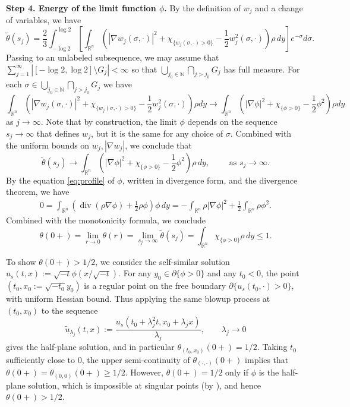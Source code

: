 \documentclass[11pt]{article}
\numberwithin{equation}{section}
\theoremstyle{definition}
\newcommand{\RR}{\mathbb{R}}
\DeclareMathOperator{\divg}{div}
\begin{document}
{\bf Step 4. Energy of the limit function $\phi$.}
By the definition of $w_j$ and a change of variables, we have
\[ \tilde{\theta}(s_j) = \frac23 \int_{-\log 2}^{\log 2} \left[ \int_{\RR^n} \left(|\nabla w_j(\sigma, \cdot)|^2 + \chi_{\{w_j(\sigma,\cdot)>0\} } - \frac12 w_j^2(\sigma,\cdot)  \right) \rho \, dy \right] e^{-\sigma} d\sigma. \]
Passing to an unlabeled subsequence, we may assume that \(\sum _{j=1}^{\infty} \left\lvert [-\log 2, \log 2] \setminus G_j \right\rvert < \infty\) so that \(\bigcup _{j_0 \in \mathbb{N}} \bigcap _{j > j_0} G_j\) has full measure. 
For each $\sigma \in\bigcup _{j_0 \in \mathbb{N}}\bigcap _{j > j_0} G_j$ 
we have
\[ \int_{\RR^n} \left(|\nabla w_j(\sigma, \cdot)|^2 + \chi_{\{w_j(\sigma,\cdot)>0\} } - \frac12 w_j^2(\sigma,\cdot)  \right) \rho dy \to \int_{\RR^n} \left(|\nabla \phi|^2 + \chi_{\{\phi>0\} } - \frac12 \phi^2  \right) \rho dy \]
as $j\to \infty$. Note that by construction, the limit $\phi$ depends on the sequence $s_j \to \infty$ that defines $w_j$, but it is the same for any choice of $\sigma $.
Combined with the uniform bounds on $w_j, |\nabla w_j|$, we conclude that
\[ \tilde{\theta}(s_j) \to \int_{\RR^n} \left(|\nabla \phi|^2 + \chi_{\{\phi>0\} } - \frac12 \phi^2  \right) \rho \, dy, \qquad \text{ as } s_j \to \infty. \]
By the equation \eqref{eq:profile} of $\phi$, written in divergence form, and the divergence theorem, we have
\begin{align*}
    0 = \int_{\RR^n} \left(\divg(\rho \nabla \phi) + \frac12 \rho\phi \right) \phi \, dy = - \int_{\RR^n} \rho|\nabla \phi|^2 + \frac12 \int_{\RR^n} \rho \phi^2.
\end{align*}
Combined with the monotonicity formula, we conclude
\[ \theta(0+) = \lim_{r\to 0} \theta(r) = \lim_{s_j \to \infty} \tilde{\theta}(s_j) = \int_{\RR^n} \chi_{\{\phi>0\} } \rho\, dy \leq 1.  \]


To show $\theta(0+)> 1/2$, we consider the self-similar solution $u_s(t,x) := \sqrt{-t} \phi(x/\sqrt{-t})$. For any $y_0\in \partial \{\phi>0\}$ and any $t_0<0$, the point $(t_0, x_0:=\sqrt{-t_0}y_0)$ is a regular point on the free boundary $\partial\{u_s(t_0,\cdot)>0\}$, with uniform Hessian bound. Thus applying the same blowup process at $(t_0,x_0)$ to the sequence
\[ \tilde{u}_{\lambda_j}(t,x) := \frac{u_s(t_0 + \lambda_j^2 t, x_0 + \lambda_j x)}{\lambda_j}, \qquad \lambda_j \to 0 \]
gives the half-plane solution, and in particular $\theta_{(t_0,x_0)}(0+) = 1/2$. Taking $t_0$ sufficiently close to $0$, the upper semi-continuity of $\theta_{(\cdot, \cdot)}(0+)$ implies that $\theta(0+) = \theta_{(0,0)}(0+) \geq 1/2$. However, $\theta(0+) = 1/2$ only if $\phi$ is the half-plane solution, which is impossible at singular points (by \cite[Theorem 8.4]{AW}), and hence $\theta(0+)> 1/2$.
\end{document}
